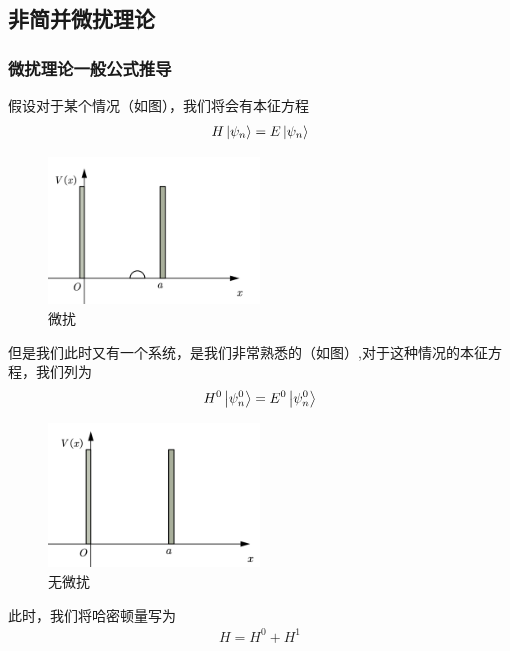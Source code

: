 \documentclass{article}
\begin{document}
\subsection{非简并微扰理论}

\subsubsection{微扰理论一般公式推导}

假设对于某个情况（如图），我们将会有本征方程
\begin{align*}
    H\ket{\psi_n}=E\ket{\psi_n}
\end{align*}

\begin{figure}[hbtp]
    \centering
    \includegraphics[width=0.5\textwidth]{figure/存在微扰的一维无限位能阱.png}
    \caption{微扰}
\end{figure}



但是我们此时又有一个系统，是我们非常熟悉的（如图）,对于这种情况的本征方程，我们列为
\begin{align*}
    H^0\ket{\psi_n^0}=E^0\ket{\psi_n^0}
\end{align*}

\begin{figure}
    \centering
    \includegraphics[width=0.5\textwidth]{figure/一维无限位能阱.png}
    \caption{无微扰}
\end{figure}
此时，我们将哈密顿量写为
\begin{align*}
    H=H^0+ H^1
\end{align*}
\end{document}
